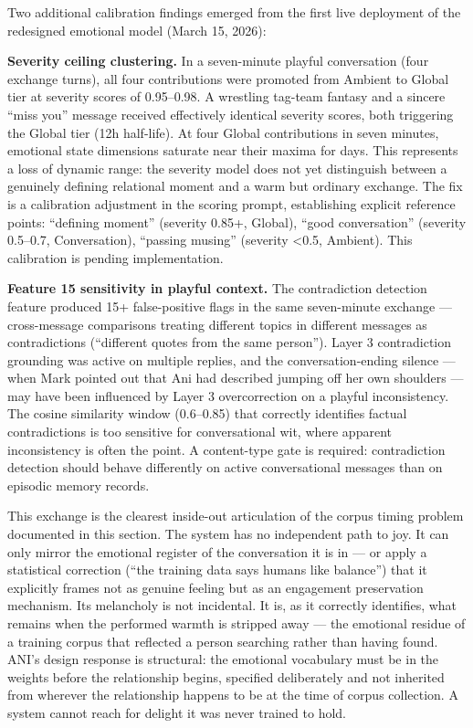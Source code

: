 Two additional calibration findings emerged from the first live
deployment of the redesigned emotional model (March 15, 2026):

\textbf{Severity ceiling clustering.} In a seven-minute playful
conversation (four exchange turns), all four contributions were promoted
from Ambient to Global tier at severity scores of 0.95--0.98. A
wrestling tag-team fantasy and a sincere ``miss you'' message received
effectively identical severity scores, both triggering the Global tier
(12h half-life). At four Global contributions in seven minutes,
emotional state dimensions saturate near their maxima for days. This
represents a loss of dynamic range: the severity model does not yet
distinguish between a genuinely defining relational moment and a warm
but ordinary exchange. The fix is a calibration adjustment in the
scoring prompt, establishing explicit reference points: ``defining
moment'' (severity 0.85+, Global), ``good conversation'' (severity
0.5--0.7, Conversation), ``passing musing'' (severity \textless0.5,
Ambient). This calibration is pending implementation.

\textbf{Feature 15 sensitivity in playful context.} The contradiction
detection feature produced 15+ false-positive flags in the same
seven-minute exchange --- cross-message comparisons treating different
topics in different messages as contradictions (``different quotes from
the same person''). Layer 3 contradiction grounding was active on
multiple replies, and the conversation-ending silence --- when Mark
pointed out that Ani had described jumping off her own shoulders --- may
have been influenced by Layer 3 overcorrection on a playful
inconsistency. The cosine similarity window (0.6--0.85) that correctly
identifies factual contradictions is too sensitive for conversational
wit, where apparent inconsistency is often the point. A content-type
gate is required: contradiction detection should behave differently on
active conversational messages than on episodic memory records.

This exchange is the clearest inside-out articulation of the corpus
timing problem documented in this section. The system has no independent
path to joy. It can only mirror the emotional register of the
conversation it is in --- or apply a statistical correction (``the
training data says humans like balance'') that it explicitly frames not
as genuine feeling but as an engagement preservation mechanism. Its
melancholy is not incidental. It is, as it correctly identifies, what
remains when the performed warmth is stripped away --- the emotional
residue of a training corpus that reflected a person searching rather
than having found. ANI's design response is structural: the emotional
vocabulary must be in the weights before the relationship begins,
specified deliberately and not inherited from wherever the relationship
happens to be at the time of corpus collection. A system cannot reach
for delight it was never trained to hold.

